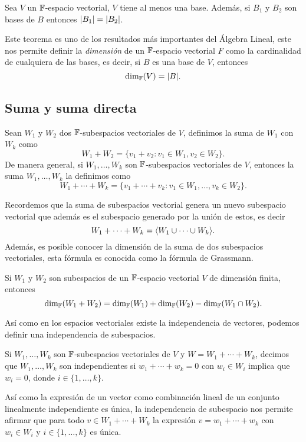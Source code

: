 \begin{teor}
  Sea $V$ un $\mathbb{F}$-espacio vectorial, $V$ tiene al menos una base. Además, si $B_1$ y $B_2$ son bases de $B$ entonces $\mathopen|B_1\mathclose| = \mathopen|B_2\mathclose|$.
\end{teor}

Este teorema es uno de los resultados más importantes del Álgebra Lineal, este nos permite definir la \emph{dimensión} de un $\mathbb{F}$-espacio vectorial $F$ como la cardinalidad de cualquiera de las bases, es decir, si $B$ es una base de $V$, entonces
\[ \dim_{\mathbb{F}} (V) = \mathopen|B\mathclose|. \]


\subsection{Suma y suma directa}
\begin{defi}
  Sean $W_1$ y $W_2$ dos $\mathbb{F}$-subespacios vectoriales de $V$, definimos la suma de $W_1$ con $W_k$ como
  \[ W_1 + W_2 = \{ v_1 + v_2 : v_1 \in W_1, v_2 \in W_2 \}.\]
  De manera general, si $W_1, \ldots, W_k$ son $\mathbb{F}$-subespacios vectoriales de $V$, entonces la suma $W_1, \ldots, W_k$  la definimos como
  \[ W_1 + \cdots + W_k = \{ v_1 + \cdots + v_k : v_1 \in W_1, \ldots ,v_k \in W_2 \}.\]
\end{defi}

Recordemos que la suma de subespacios vectorial genera un nuevo subespacio vectorial que además es el subespacio generado por la unión de estos, es decir
  \[ W_1 + \cdots + W_k = \langle W_1 \cup \cdots \cup W_k \rangle. \]
Además, es posible conocer la dimensión de la suma de dos subespacios vectoriales, esta fórmula es conocida como la fórmula de Grassmann.
\begin{teor}
  Si $W_1$ y $W_2$ son subespacios de un $\mathbb{F}$-espacio vectorial $V$ de dimensión finita, entonces
    \[ \dim_{\mathbb{F}} (W_1 + W_2) = \dim_{\mathbb{F}} (W_1) + \dim_{\mathbb{F}} (W_2) - \dim_{\mathbb{F}} (W_1 \cap W_2).\]
\end{teor}


Así como en los espacios vectoriales existe la independencia de vectores, podemos definir una independencia de subespacios.

\begin{defi}
  Si $W_1, \ldots, W_k$ son $\mathbb{F}$-subespacios vectoriales de $V$ y $W = W_1 + \cdots + W_k$, decimos que  $W_1, \ldots, W_k$ son independientes si $w_1 + \cdots + w_k = 0$ con $w_i \in W_i$ implica que $w_i = 0$, donde $i \in \{1,\ldots,k\}$.
\end{defi}

Así como la expresión de un vector como combinación lineal de un conjunto linealmente independiente es única, la independencia de subespacio nos permite afirmar que para todo $v \in W_1 + \cdots + W_k$ la expresión $v = w_1 + \cdots + w_k$ con $w_i \in W_i$ y $i \in \{1, \ldots, k\}$ es única.

